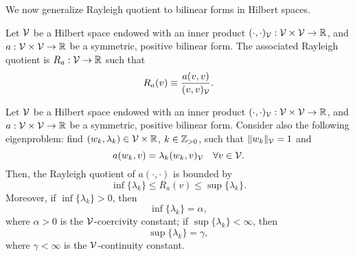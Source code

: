 We now generalize Rayleigh quotient to bilinear forms in Hilbert spaces.
\begin{definition}
  Let $\mathcal{V}$ be a Hilbert space endowed with an inner product $(\cdot,\cdot)_{\mathcal{V}} : \mathcal{V} \times \mathcal{V} \to \mathbb{R}$, and $a: \mathcal{V} \times \mathcal{V} \to \mathbb{R}$ be a symmetric, positive bilinear form.  The associated Rayleigh quotient is $R_a: \mathcal{V} \to \mathbb{R}$ such that
  \begin{equation*}
    R_a(v) \equiv \frac{a(v,v)}{(v,v)_{\mathcal{V}}}.
  \end{equation*}
\end{definition}
\begin{proposition}
  Let $\mathcal{V}$ be a Hilbert space endowed with an inner product $(\cdot,\cdot)_{\mathcal{V}} : \mathcal{V} \times \mathcal{V} \to \mathbb{R}$, and $a: \mathcal{V} \times \mathcal{V} \to \mathbb{R}$ be a symmetric, positive bilinear form. Consider also the following eigenproblem: find $(w_k,\lambda_k) \in \mathcal{V} \times \mathbb{R}$, $k \in \mathbb{Z}_{> 0}$, such that $\| w_k \|_{\mathcal{V}} = 1$ and 
  \begin{equation*}
    a(w_k,v) = \lambda_k (w_k,v)_{\mathcal{V}} \quad \forall v \in \mathcal{V}.
  \end{equation*}
  Then, the Rayleigh quotient of $a(\cdot,\cdot)$ is bounded by
  \begin{equation*}
    \inf \{ \lambda_k \} \leq R_a(v) \leq \sup \{ \lambda_k \} .
  \end{equation*}
  Moreover, if $\inf \{\lambda_k \} > 0$, then 
  \begin{equation*}
    \inf \{\lambda_k\} = \alpha,
  \end{equation*}
  where $\alpha > 0$ is the $\mathcal{V}$-coercivity constant; if $\sup \{ \lambda_k \} < \infty$, then
  \begin{equation*}
    \sup \{\lambda_k \} = \gamma,
  \end{equation*}
  where $\gamma < \infty$ is the $\mathcal{V}$-continuity constant.

\end{proposition}
